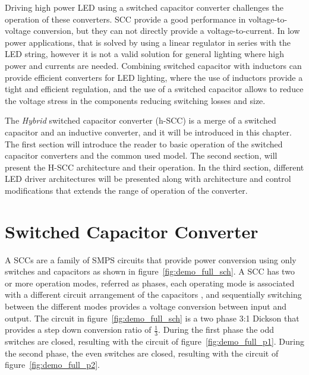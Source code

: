 Driving high power LED using a switched capacitor converter challenges the operation of these converters. SCC provide a good performance in voltage-to-voltage conversion, but they can not directly provide a voltage-to-current. In low power applications, that is solved by using a linear regulator in series with the LED string, however it is not a valid solution for general lighting where high power and currents are needed. Combining switched capacitor with inductors can provide efficient converters for LED lighting, where the use of inductors provide a tight and efficient regulation, and the use of a switched capacitor allows to reduce the voltage stress in the components reducing switching losses and size.

The \emph{Hybrid} switched capacitor converter (h-SCC) is a merge of a switched capacitor and an inductive converter, and it will be introduced in this chapter. The first section will introduce the reader to basic operation of the switched capacitor converters and the common used model. The second section, will present the H-SCC architecture and their operation. In the third section, different LED driver architectures will be presented along with architecture and control modifications that extends the range of operation of the converter.

\section{Switched Capacitor Converter}

A SCCs are a family of SMPS circuits that provide power conversion using only switches and capacitors as shown in figure~\ref{fig:demo_full_sch}. A SCC has two or more operation modes, referred as phases, each operating mode is associated with a different circuit arrangement of the capacitors , and sequentially switching between the different modes provides a voltage conversion between input and output. The circuit in figure~\ref{fig:demo_full_sch} is a two phase 3:1 Dickson that provides a step down conversion ratio of $\frac{1}{3}$. During the first phase the odd switches are closed, resulting with the circuit of figure~\ref{fig:demo_full_p1}. During the second phase, the even switches are closed, resulting with the circuit of figure~\ref{fig:demo_full_p2}.


